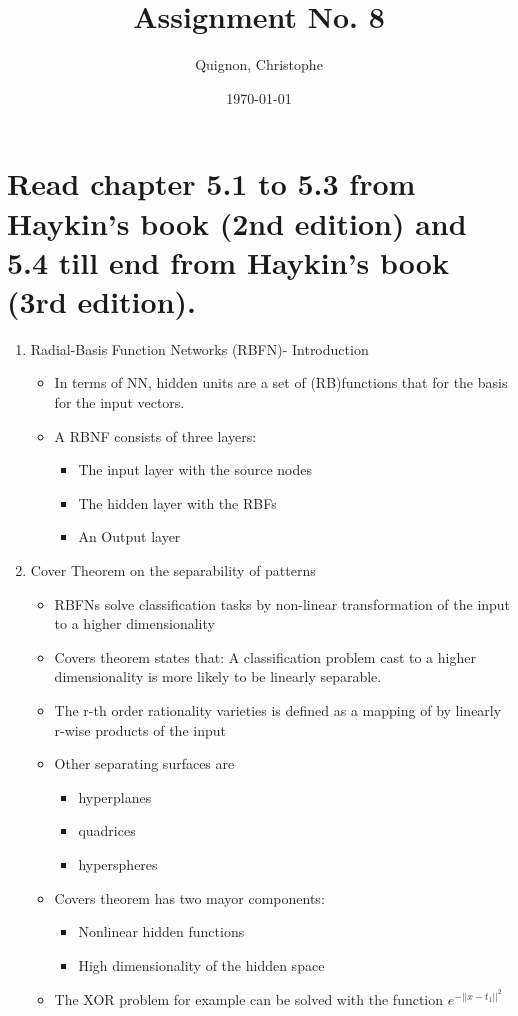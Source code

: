 \documentclass{scrartcl}
\begin{document}
\title{Assignment No. 8}
\subtitle{}
\author{
  Quignon, Christophe \\
} 
\date{\today}


\maketitle

\section{Read chapter 5.1 to 5.3 from Haykin’s book (2nd edition) and 5.4 till end from Haykin’s
book (3rd edition).
}

\begin{enumerate}
\item Radial-Basis Function Networks (RBFN)- Introduction

	\begin{itemize}
	\item In terms of NN, hidden units are a set of (RB)functions that for the basis for the input vectors.
	\item A RBNF consists of three layers:
		\begin{itemize}
		\item The input layer with the source nodes
		\item The hidden layer with the RBFs
		\item An Output layer 
		\end{itemize}

	\end{itemize}

\item Cover Theorem on the separability of patterns
	\begin{itemize}
	\item RBFNs solve classification tasks by non-linear transformation of the input to a higher dimensionality
	\item Covers theorem states that: A classification problem cast to a higher dimensionality is more likely to be linearly separable.
	\item The r-th order rationality varieties is defined as a mapping of by linearly r-wise products of the input
	\item Other separating surfaces are
		\begin{itemize}
		\item hyperplanes
		\item quadrices
		\item hyperspheres
		\end{itemize}
	\item Covers theorem has two mayor components:
		\begin{itemize}
		\item Nonlinear hidden functions
		\item High dimensionality of the hidden space
		\end{itemize}
	\item The XOR problem for example can be solved with the function $e^{-||x-t_{1}||^{2}}$
	\end{itemize}
	

\end{enumerate}
\end{document}
